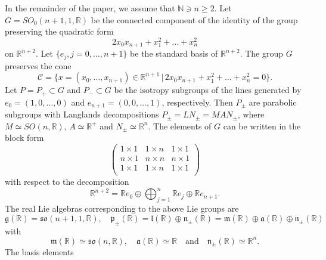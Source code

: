 \documentclass[a4paper,12pt,reqno]{amsart}
\numberwithin{theorem}{subsection}
\numberwithin{equation}{section}
\begin{document}
In the remainder of the paper, we assume that ${\mathbb{N}} \ni n \ge 2$. Let
$G=SO_0(n+1,1,{\mathbb{R}})$ be the connected component of the identity of the group
preserving the quadratic form
$$
   2 x_0 x_{n+1} + x_1^2 + \dots + x_n^2
$$
on ${\mathbb{R}}^{n+2}$. Let $\{e_j, j=0,\dots,n+1\}$ be the standard basis of
${\mathbb{R}}^{n+2}$. The group $G$ preserves the cone
$$
   \mathcal{C} = \{ x = (x_0,\dots,x_{n+1}) \in {\mathbb{R}}^{n+1} \,|\, 2 x_0 x_{n+1} + x_1^2 + \dots + x_n^2 = 0 \}.
$$
Let $P = P_+ \subset G $ and $P_- \subset G$ be the isotropy subgroups of the
lines generated by $e_0 = (1,0,\dots,0)$ and $e_{n+1} = (0,0,\dots,1)$,
respectively. Then $P_\pm$ are parabolic subgroups with Langlands
decompositions $P_\pm = LN_\pm = MAN_\pm$, where $M \simeq SO(n,{\mathbb{R}})$, $A\simeq
{\mathbb{R}}^+$ and $N_\pm \simeq {\mathbb{R}}^n$. The elements of $G$ can be written in the block
form
$$
\begin{pmatrix}
         1\times 1 & 1\times n & 1\times 1\\
         n\times 1 & n\times n & n\times 1\\
         1\times 1 & 1\times n & 1\times 1\\
\end{pmatrix}
$$
with respect to the decomposition
$$
{\mathbb{R}}^{n+2} = {\mathbb{R}} e_0 \oplus \bigoplus_{j=1}^{n} {\mathbb{R}} e_j \oplus {\mathbb{R}} e_{n+1}.
$$
The real Lie algebras corresponding to the above Lie groups are
\begin{equation}\label{eq:LieAlgebras}
   {{\mathfrak g}}({\mathbb{R}}) = \mathfrak{so}(n+1,1,{\mathbb{R}}), \quad {{\mathfrak p}}_\pm({\mathbb{R}}) = {{\mathfrak l}}({\mathbb{R}}) \oplus {{\mathfrak n}}_\pm({\mathbb{R}}) =
   {{\mathfrak m}}({\mathbb{R}}) \oplus {{\mathfrak a}}({\mathbb{R}}) \oplus {{\mathfrak n}}_\pm({\mathbb{R}})
\end{equation}
with
\begin{equation*}
   {{\mathfrak m}}({\mathbb{R}}) \simeq \mathfrak{so}(n,{\mathbb{R}}), \quad {{\mathfrak a}}({\mathbb{R}}) \simeq {\mathbb{R}} \quad \mbox{and} \quad {{\mathfrak n}}_\pm({\mathbb{R}}) \simeq {\mathbb{R}}^n.
\end{equation*}
The basis elements
\end{document}
